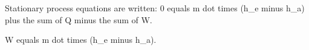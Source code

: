 Stationary process equations are written:  
0 equals m dot times (h_e minus h_a) plus the sum of Q minus the sum of W.  

W equals m dot times (h_e minus h_a).